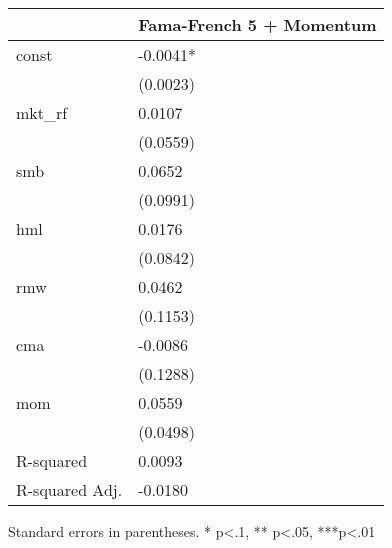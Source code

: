 \begin{table}
\caption{}
\label{}
\begin{center}
\begin{tabular}{ll}
\hline
               & Fama-French 5 + Momentum  \\
\hline
const          & -0.0041*                  \\
               & (0.0023)                  \\
mkt\_rf        & 0.0107                    \\
               & (0.0559)                  \\
smb            & 0.0652                    \\
               & (0.0991)                  \\
hml            & 0.0176                    \\
               & (0.0842)                  \\
rmw            & 0.0462                    \\
               & (0.1153)                  \\
cma            & -0.0086                   \\
               & (0.1288)                  \\
mom            & 0.0559                    \\
               & (0.0498)                  \\
R-squared      & 0.0093                    \\
R-squared Adj. & -0.0180                   \\
\hline
\end{tabular}
\end{center}
\end{table}
\bigskip
Standard errors in parentheses. \newline 
* p<.1, ** p<.05, ***p<.01